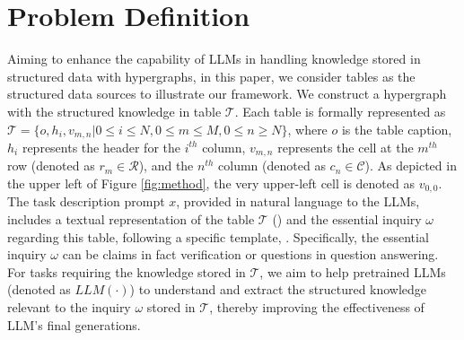 \section{Problem Definition}
Aiming to enhance the capability of LLMs in handling knowledge stored in structured data with hypergraphs, in this paper, we consider tables as the structured data sources to illustrate our \name framework. We construct a hypergraph with the structured knowledge in table $\mathcal{T}$. Each table is formally represented as $\mathcal{T}=\{o, h_i, v_{m,n}|0\leq i \leq N,0\leq m \leq M,0\leq n\geq N\}$, where $o$ is the table caption, $h_i$ represents the header for the $i^{th}$ column, $v_{m,n}$ represents the cell at the $m^{th}$ row (denoted as $r_{m}\in\mathcal{R}$), and the $n^{th}$ column (denoted as $c_{n}\in\mathcal{C}$). As depicted in the upper left of Figure \ref{fig:method}, the very upper-left cell is denoted as $v_{0,0}$. The task description prompt $x$, provided in natural language to the LLMs, includes a textual representation of the table $\mathcal{T}$ () and the essential inquiry $\omega$ regarding this table, following a specific template, . Specifically, the essential inquiry $\omega$ can be claims in fact verification or questions in question answering. For tasks requiring the knowledge stored in $\mathcal{T}$, we aim to help pretrained LLMs (denoted as $LLM(\cdot)$) to understand and extract the structured knowledge relevant to the inquiry $\omega$ stored in $\mathcal{T}$, thereby improving the effectiveness of LLM's final generations. 

